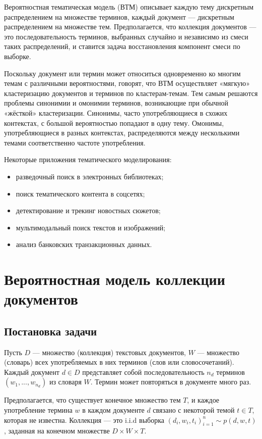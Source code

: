 \documentclass[12pt, a4paper, substylefile = spbu.rtx]{disser}
\theoremstyle{definition}
\begin{document}
Вероятностная тематическая модель (ВТМ) описывает каждую тему дискретным распределением на множестве терминов, каждый документ --- дискретным распределением на множестве тем. Предполагается, что коллекция документов --- это последовательность терминов, выбранных случайно и независимо из смеси таких распределений, и ставится задача восстановления компонент смеси по выборке.

Поскольку документ или термин может относиться одновременно ко многим темам с различными вероятностями, говорят, что ВТМ осуществляет «мягкую» кластеризацию документов и терминов по кластерам-темам. Тем самым решаются проблемы синонимии и омонимии терминов, возникающие при обычной «жёсткой» кластеризации. Синонимы, часто употребляющиеся в схожих контекстах, с большой вероятностью попадают в одну тему. Омонимы, употребляющиеся в разных контекстах, распределяются между несколькими темами соответственно частоте употребления.

Некоторые приложения тематического моделирования:

\begin{itemize} 
\item разведочный поиск в электронных библиотеках;
\item поиск тематического контента в соцсетях;
\item детектирование и трекинг новостных сюжетов;
\item мультимодальный поиск текстов и изображений;
\item анализ банковских транзакционных данных.
\end{itemize}

\section{Вероятностная модель коллекции документов} 
   
   \subsection{Постановка задачи}
    
   Пусть $D$ --- множество (коллекция) текстовых документов, $W$ --- множество (словарь) всех употребляемых в них терминов (слов или словосочетаний). Каждый документ $d\in D$ представляет собой последовательность $n_d$ терминов $(w_1, . . . , w_n_d)$ из словаря $W$. Термин может повторяться в документе много раз.
   
   Предполагается, что существует конечное множество тем $T$, и каждое употребление термина $w$ в каждом документе $d$ связано с некоторой темой $t\in T$, которая не известна. Коллекция --- это i.i.d выборка $(d_i,w_i,t_i)^n_{i=1}\sim p(d,w,t)$, заданная на конечном множестве $D\times W\times T$. 
\end{document}
